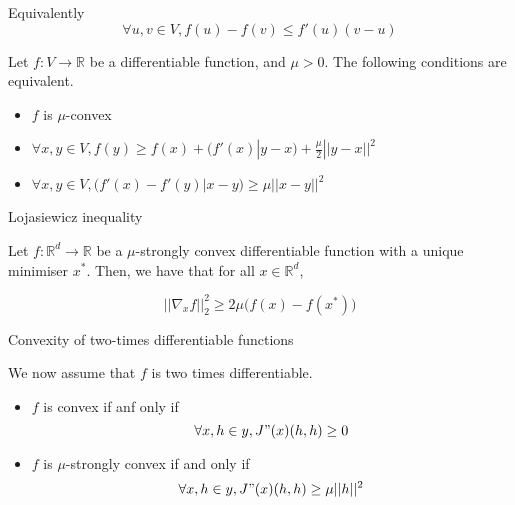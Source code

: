 \documentclass[
10pt, %
a4paper, %
oneside, %
headinclude,footinclude, %
BCOR5mm, %
]{scrartcl}
\begin{document}
\begin{remark}
    Equivalently
    \begin{equation*}
	\forall u,v\in V, f(u)-f(v)\leq f'(u)(v-u)
    \end{equation*}
\end{remark}

\begin{proposition}
    \label{prop:alphaconv}
    Let $f:V \rightarrow \mathbb{R} $ be a differentiable function, and $\mu>0$. The following conditions are equivalent.
    \begin{itemize}
        \item $f$ is $ \mu$-convex
	\item $\forall x, y\in V, f(y)\geq f(x)+(f'(x)|y-x)+ \frac{  \mu}{2} ||y-x||^2$
	\item $\forall x, y\in V, (f'(x)-f'(y)|x-y)\geq \mu ||x-y||^2$
    \end{itemize}
\end{proposition}

\begin{lemma}{Lojasiewicz inequality}

    Let $f: \mathbb{R}^d\rightarrow \mathbb{R} $ be a $\mu$-strongly convex differentiable function with a unique minimiser $x^*$. Then, we have that for all $x\in \mathbb{R}^d$, 

    \begin{equation*}
	||\nabla_xf||_2^2\geq 2\mu \big(f(x)-f(x^*)\big)
    \end{equation*}
\end{lemma}

\begin{proposition}{Convexity of two-times differentiable functions}

    We now assume that $f$ is two times differentiable.

    \begin{itemize}
	\item $f$ is convex if anf only if
	    \begin{equation*}
		\forall x, h\in y, J"(x)(h, h)\geq 0
	    \end{equation*}
	\item $f$ is $\mu$-strongly convex if and only if
	    \begin{equation*}
		\forall x, h\in y, J"(x)(h, h)\geq \mu ||h||^2
	    \end{equation*}
    \end{itemize}

\end{proposition}
\end{document}

